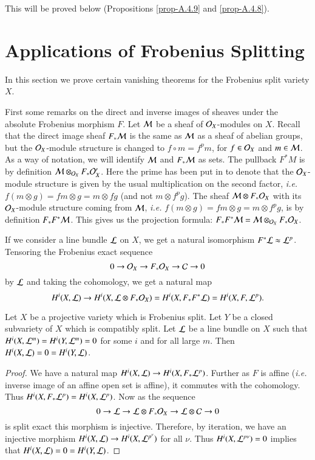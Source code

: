 This will be proved below (Propositions \ref{prop-A.4.9} and
\ref{prop-A.4.8}). 

\section{Applications of Frobenius
  Splitting}\label{sec-A.2}\pageoriginale

In\label{page79} this section we prove certain vanishing theorems for the Frobenius
split variety $X$.

First some remarks on the direct and inverse images of sheaves under
the absolute Frobenius morphism $F$. Let $\mathcal{M}$ be a sheaf of
$\mathcal{O}_{X}$-modules on $X$. Recall that the direct image sheaf
$F_{\ast}\mathcal{M}$ is the same as $\mathcal{M}$ as a sheaf of abelian groups, but the
$\mathcal{O}_{X}$-module structure is changed to $f\circ m=f^{p}m$, for $f\in
\mathcal{O}_{X}$ and $m\in \mathcal{M}$. As a way of notation, we will identify $\mathcal{M}$ and
$F_{\ast}\mathcal{M}$ as sets. The pullback $F^{\ast}M$ is by definition
$\mathcal{M}\otimes_{\mathcal{O}_{X}}F_{\ast}\mathcal{O}'_{X}$. Here the prime has been put in to
denote that the $\mathcal{O}_{X}$-module structure is given by the usual
multiplication on the second factor, {\em i.e.} $f(m\otimes
g)=fm\otimes g=m\otimes fg$ (and not $m\otimes f^{p}g$). The sheaf
$\mathcal{M}\otimes F_{\ast}\mathcal{O}_{X}$ with its $\mathcal{O}_{X}$-module structure coming
from $\mathcal{M}$, {\em i.e.} $f(m\otimes g)=fm\otimes g=m\otimes f^{p}g$, is
by definition $F_{\ast}F^{\ast}\mathcal{M}$. This gives us the projection
formula: $F_{\ast}F^{\ast}\mathcal{M}=\mathcal{M}\otimes_{\mathcal{O}_{X}} F_{\ast}\mathcal{O}_{X}$.

If we consider a line bundle $\mathcal{L}$ on $X$, we get a natural isomorphism
$F^{\ast}\mathcal{L}\approx \mathcal{L}^{p}$. Tensoring the Frobenius exact sequence
$$
0\to \mathcal{O}_{X}\to F_{\ast}\mathcal{O}_{X}\to \mathcal{C}\to 0
$$
by $\mathcal{L}$ and taking the cohomology, we get a natural map
$$
H^{i}(X,\mathcal{L})\to H^{i}(X,\mathcal{L}\otimes
F_{\ast}\mathcal{O}_{X})=H^{i}(X,F_{\ast}F^{\ast}\mathcal{L})=H^{i}(X,F,\mathcal{L}^{p}).
$$

\begin{proposition}\label{prop-A.2.1}
Let $X$ be a projective variety which is Frobenius split. Let $Y$ be a
closed subvariety of $X$ which is compatibly split. Let $\mathcal{L}$ be a line
bundle on $X$ such that $H^{i}(X,\mathcal{L}^{m})=H^{i}(Y,\mathcal{L}^{m})=0$ for some
$i$ and for all large $m$. Then $H^{i}(X,\mathcal{L})=0=H^{i}(Y,\mathcal{L})$.
\end{proposition}

\begin{proof}
We have a natural map $H^{i}(X,\mathcal{L})\to
H^{i}(X,F_{\ast}\mathcal{L}^{p})$. Further as $F$ is affine ({\em i.e.} inverse
image of an affine open set is affine), it commutes with the
cohomology. Thus $H^{i}(X,F_{\ast}\mathcal{L}^{p})=H^{i}(X,\mathcal{L}^{p})$. Now as the
sequence
$$
0\to \mathcal{L}\to \mathcal{L}\otimes F_{\ast}\mathcal{O}_{X}\to \mathcal{L}\otimes \mathcal{C}\to 0
$$
is split exact this morphism is injective. Therefore, by iteration, we
have an injective morphism $H^{i}(X,\mathcal{L})\to H^{i}(X,\mathcal{L}^{p^{\nu}})$ for
all $\nu$. Thus $H^{i}(X,\mathcal{L}^{p\nu})=0$ implies that
$H^{i}(X,\mathcal{L})=0=H^{i}(Y,\mathcal{L})$. 
\end{proof}


